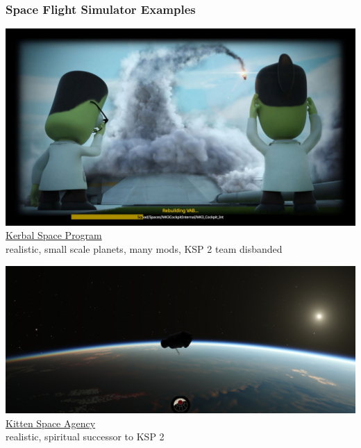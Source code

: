 \documentclass[aspectratio=169,11pt,xcolor=dvipsnames]{beamer}
\begin{document}
\begin{frame}
  \frametitle{Space Flight Simulator Examples}
  \begin{minipage}[t]{0.49\textwidth}
    \begin{center}
      \includegraphics[width=\textwidth]{ksp}\\
      \href{https://www.kerbalspaceprogram.com/}{Kerbal Space Program}\\
      realistic, small scale planets, many mods, KSP 2 team disbanded
    \end{center}
  \end{minipage}
  \begin{minipage}[t]{0.49\textwidth}
    \begin{center}
      \includegraphics[width=\textwidth]{ksa}\\
      \href{https://rocketwerkz.com/}{Kitten Space Agency}\\
      realistic, spiritual successor to KSP 2
    \end{center}
  \end{minipage}
\end{frame}
\end{document}
